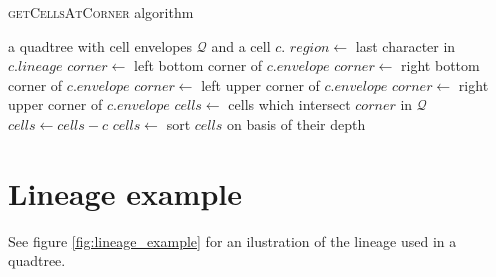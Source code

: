 \begin{algorithm} 
    \caption{\textsc{getCellsAtCorner} algorithm}
    \begin{algorithmic}
    \Require a quadtree with cell envelopes $\mathcal Q$ and a cell $c$.
        \State $region \gets $ last character in $c.lineage$
                \State $corner \gets$ left bottom corner of $c.envelope$
            \EndCase
                \State $corner \gets$ right bottom corner of $c.envelope$
            \EndCase
                \State $corner \gets$ left upper corner of $c.envelope$
            \EndCase
                \State $corner \gets$ right upper corner of $c.envelope$
            \EndCase
        \EndSwitch
        \State $cells \gets$ cells which intersect $corner$ in $\mathcal Q$
        \State $cells \gets cells - c$ 
        \State $cells \gets$ sort $cells$ on basis of their depth 
        \State {}
    \EndFunction
    \end{algorithmic}
\end{algorithm}

\section{Lineage example}
See figure \ref{fig:lineage_example} for an ilustration of the lineage used in a quadtree.

